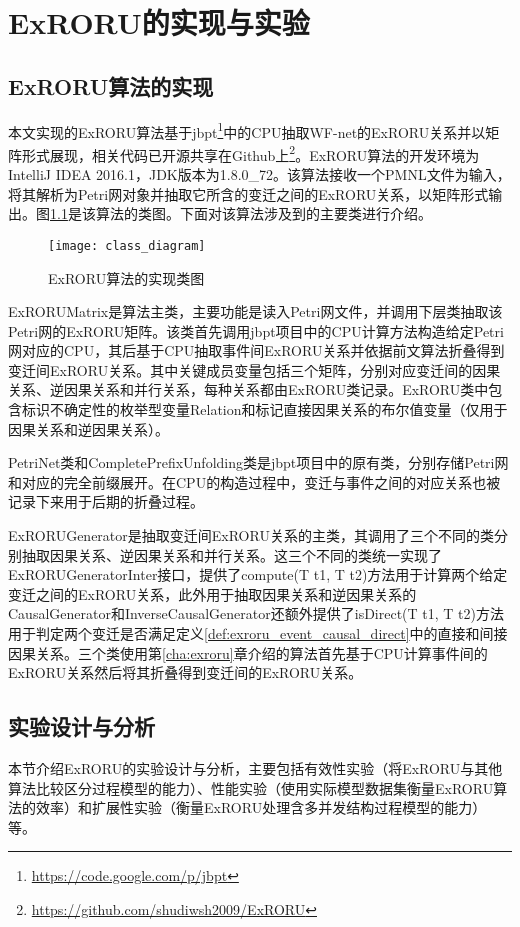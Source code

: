 
\chapter{ExRORU的实现与实验}\label{cha:experiment}

\section{ExRORU算法的实现}\label{sec:implementation}
本文实现的ExRORU算法基于jbpt\footnote{\url{https://code.google.com/p/jbpt}}中的CPU抽取WF-net的ExRORU关系并以矩阵形式展现，相关代码已开源共享在Github上\footnote{\url{https://github.com/shudiwsh2009/ExRORU}}。ExRORU算法的开发环境为IntelliJ IDEA 2016.1，JDK版本为1.8.0\_72。该算法接收一个PMNL文件为输入，将其解析为Petri网对象并抽取它所含的变迁之间的ExRORU关系，以矩阵形式输出。图\ref{fig:class_diagram}是该算法的类图。下面对该算法涉及到的主要类进行介绍。

\begin{figure}[htbp]
  \centering
  \texttt{[image: class\_diagram]}
  \caption{ExRORU算法的实现类图}
  \label{fig:class_diagram}
\end{figure}

ExRORUMatrix是算法主类，主要功能是读入Petri网文件，并调用下层类抽取该Petri网的ExRORU矩阵。该类首先调用jbpt项目中的CPU计算方法构造给定Petri网对应的CPU，其后基于CPU抽取事件间ExRORU关系并依据前文算法折叠得到变迁间ExRORU关系。其中关键成员变量包括三个矩阵，分别对应变迁间的因果关系、逆因果关系和并行关系，每种关系都由ExRORU类记录。ExRORU类中包含标识不确定性的枚举型变量Relation和标记直接因果关系的布尔值变量（仅用于因果关系和逆因果关系）。

PetriNet类和CompletePrefixUnfolding类是jbpt项目中的原有类，分别存储Petri网和对应的完全前缀展开。在CPU的构造过程中，变迁与事件之间的对应关系也被记录下来用于后期的折叠过程。

ExRORUGenerator是抽取变迁间ExRORU关系的主类，其调用了三个不同的类分别抽取因果关系、逆因果关系和并行关系。这三个不同的类统一实现了ExRORUGeneratorInter接口，提供了compute(T t1, T t2)方法用于计算两个给定变迁之间的ExRORU关系，此外用于抽取因果关系和逆因果关系的CausalGenerator和InverseCausalGenerator还额外提供了isDirect(T t1, T t2)方法用于判定两个变迁是否满足定义\ref{def:exroru_event_causal_direct}中的直接和间接因果关系。三个类使用第\ref{cha:exroru}章介绍的算法首先基于CPU计算事件间的ExRORU关系然后将其折叠得到变迁间的ExRORU关系。

\section{实验设计与分析}\label{sec:experiment}
本节介绍ExRORU的实验设计与分析，主要包括有效性实验（将ExRORU与其他算法比较区分过程模型的能力）、性能实验（使用实际模型数据集衡量ExRORU算法的效率）和扩展性实验（衡量ExRORU处理含多并发结构过程模型的能力）等。

